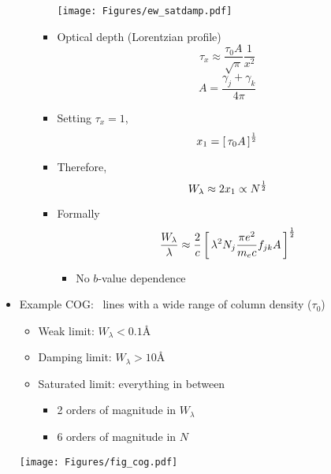 \documentclass[12pt,letterpaper]{article}
\begin{document}
\begin{Aenumerate}
\begin{itemize}
\begin{enumerate}
\begin{itemize}
	\texttt{[image: Figures/ew\_satdamp.pdf]}

	\item Optical depth (Lorentzian profile)
	\begin{equation}
	\tau_x \approx \frac{\tau_0 A}{\sqrt{\pi}} \frac{1}{x^2}
	\end{equation}
	\begin{equation}
	A = \frac{\gamma_j + \gamma_k}{4\pi}
	\end{equation}
	
	\item Setting $\tau_x = 1$,
	\begin{equation}
	x_1 = \left [ \, \tau_0 A \, \right ]^{\frac{1}{2}}
	\end{equation}

	\item Therefore, 
	\begin{equation}
	W_\lambda \approx 2x_1 \propto N^{\frac{1}{2}}
	\end{equation}

	\item Formally
	\begin{equation}
	\frac{W_\lambda}{\lambda} \approx \frac{2}{c} \left [ \, \lambda^2 N_j 
		\frac{\pi e^2}{m_e c} f_{jk} A \, \right ]^{\frac{1}{2}}
	\end{equation}
		\begin{itemize}
		\item No $b$-value dependence
		\end{itemize}

	\end{itemize}

   \end{enumerate}

 \item Example COG: \lya\ lines with a wide range of column density ($\tau_0$)
	\begin{itemize}
	\item Weak limit: $W_\lambda < 0.1$\AA
	\item Damping limit: $W_\lambda > 10$\AA
	\item Saturated limit: everything in between
		\begin{itemize}
		\item 2 orders of magnitude in $W_\lambda$
		\item 6 orders of magnitude in $N$
		\end{itemize}
	\end{itemize}

	\texttt{[image: Figures/fig\_cog.pdf]}


\end{itemize}
\end{Aenumerate}
\end{document}
